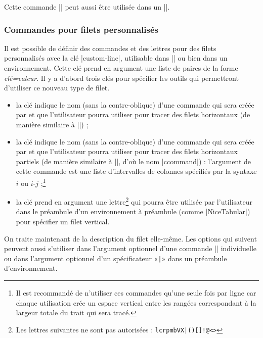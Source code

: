 \documentclass[dvipsnames]{article}%
\begin{document}
\medskip
Cette commande |\diagbox| peut aussi être utilisée dans un |\Block|.



\subsubsection{Commandes pour filets personnalisés}
\label{custom-line}


Il est possible de définir des commandes et des lettres pour des filets
personnalisés avec la clé |custom-line|, utilisable dans |\NiceMatrixOptions| ou
bien dans un environnement. Cette clé prend en argument une liste de paires de
la forme \textsl{clé=valeur}. Il y a d'abord trois clés pour spécifier les outils
qui permettront d'utiliser ce nouveau type de filet.

\begin{itemize}
\item la clé  indique le nom (sans la contre-oblique) d'une commande
qui sera créée par  et que l'utilisateur pourra utiliser pour
tracer des filets horizontaux (de manière similaire à |\hline|) ; 

\item la clé  indique le nom (sans la contre-oblique) d'une
commande qui sera créée par  et que l'utilisateur pourra
utiliser pour tracer des filets horizontaux partiels (de manière similaire à
|\cline|, d'où le nom |ccommand|) : l'argument de cette commande est une liste
d'intervalles de colonnes spécifiés par la syntaxe $i$ ou $i$-$j$ ;\footnote{Il
  est recommandé de n'utiliser ces commandes qu'une seule fois par ligne car
  chaque utilisation crée un espace vertical entre les rangées correspondant à
  la largeur totale du trait qui sera tracé.}

\item la clé  prend en argument une lettre\footnote{Les lettres
  suivantes ne sont pas autorisées : \verb+lcrpmbVX|()[]!@<>+} qui pourra être
utilisée par l'utilisateur dans le préambule d'un environnement à préambule
(comme |{NiceTabular}|) pour spécifier un filet vertical.
\end{itemize}

\bigskip
On traite maintenant de la description du filet elle-même. Les options qui
suivent peuvent aussi s'utiliser dans l'argument optionnel d'une commande
|\Hline| individuelle ou dans l'argument optionnel d'un spécificateur «\verb+|+»
dans un préambule d'environnement.
\end{document}
